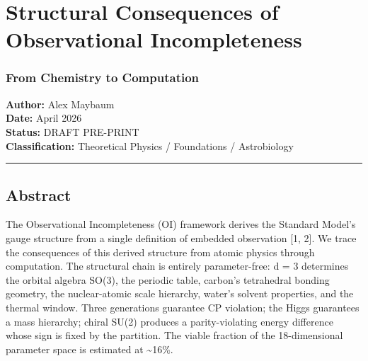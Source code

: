\documentclass[
]{article}
\author{}
\date{}
\begin{document}
\hypertarget{structural-consequences-of-observational-incompleteness}{%
\section{Structural Consequences of Observational
Incompleteness}\label{structural-consequences-of-observational-incompleteness}}

\hypertarget{from-chemistry-to-computation}{%
\subsubsection{From Chemistry to
Computation}\label{from-chemistry-to-computation}}

\textbf{Author:} Alex Maybaum\\
\textbf{Date:} April 2026\\
\textbf{Status:} DRAFT PRE-PRINT\\
\textbf{Classification:} Theoretical Physics / Foundations /
Astrobiology

\begin{center}\rule{0.5\linewidth}{0.5pt}\end{center}

\hypertarget{abstract}{%
\subsection{Abstract}\label{abstract}}

The Observational Incompleteness (OI) framework derives the Standard
Model's gauge structure from a single definition of embedded observation
{[}1, 2{]}. We trace the consequences of this derived structure from
atomic physics through computation. The structural chain is entirely
parameter-free: d = 3 determines the orbital algebra SO(3), the periodic
table, carbon's tetrahedral bonding geometry, the nuclear-atomic scale
hierarchy, water's solvent properties, and the thermal window. Three
generations guarantee CP violation; the Higgs guarantees a mass
hierarchy; chiral SU(2) produces a parity-violating energy difference
whose sign is fixed by the partition. The viable fraction of the
18-dimensional parameter space is estimated at \textasciitilde16\%.
\end{document}
